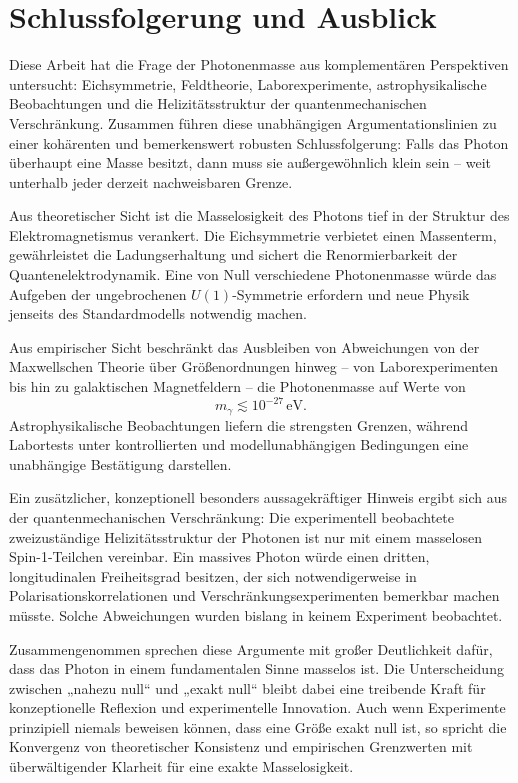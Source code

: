 
\section{Schlussfolgerung und Ausblick}

Diese Arbeit hat die Frage der Photonenmasse aus 
komplementären Perspektiven untersucht: Eichsymmetrie, 
Feldtheorie, Laborexperimente, astrophysikalische Beobachtungen 
und die Helizitätsstruktur der quantenmechanischen 
Verschränkung. Zusammen führen diese unabhängigen 
Argumentationslinien zu einer kohärenten und bemerkenswert 
robusten Schlussfolgerung: Falls das Photon überhaupt eine 
Masse besitzt, dann muss sie außergewöhnlich klein sein – 
weit unterhalb jeder derzeit nachweisbaren Grenze.

Aus theoretischer Sicht ist die Masselosigkeit des Photons 
tief in der Struktur des Elektromagnetismus verankert. Die 
Eichsymmetrie verbietet einen Massenterm, gewährleistet die 
Ladungserhaltung und sichert die Renormierbarkeit der 
Quantenelektrodynamik. Eine von Null verschiedene 
Photonenmasse würde das Aufgeben der ungebrochenen 
$U(1)$-Symmetrie erfordern und neue Physik jenseits des 
Standardmodells notwendig machen.

Aus empirischer Sicht beschränkt das Ausbleiben von 
Abweichungen von der Maxwellschen Theorie über 
Größenordnungen hinweg – von Laborexperimenten bis hin zu 
galaktischen Magnetfeldern – die Photonenmasse auf Werte von
\[
m_\gamma \lesssim 10^{-27}\,\text{eV}.
\]
Astrophysikalische Beobachtungen liefern die strengsten 
Grenzen, während Labortests unter kontrollierten und 
modellunabhängigen Bedingungen eine unabhängige Bestätigung 
darstellen.

Ein zusätzlicher, konzeptionell besonders aussagekräftiger 
Hinweis ergibt sich aus der quantenmechanischen 
Verschränkung: Die experimentell beobachtete zweizuständige 
Helizitätsstruktur der Photonen ist nur mit einem masselosen 
Spin-1-Teilchen vereinbar. Ein massives Photon würde einen 
dritten, longitudinalen Freiheitsgrad besitzen, der sich 
notwendigerweise in Polarisationskorrelationen und 
Verschränkungsexperimenten bemerkbar machen müsste. Solche 
Abweichungen wurden bislang in keinem Experiment beobachtet.

Zusammengenommen sprechen diese Argumente mit großer 
Deutlichkeit dafür, dass das Photon in einem fundamentalen 
Sinne masselos ist. Die Unterscheidung zwischen „nahezu 
null“ und „exakt null“ bleibt dabei eine treibende Kraft für 
konzeptionelle Reflexion und experimentelle Innovation. 
Auch wenn Experimente prinzipiell niemals beweisen können, 
dass eine Größe exakt null ist, so spricht die Konvergenz von 
theoretischer Konsistenz und empirischen Grenzwerten mit 
überwältigender Klarheit für eine exakte Masselosigkeit.

